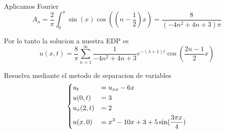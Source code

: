 \message{ !name(MAT024.tex)}\documentclass[../main.tex]{subfiles}
\begin{document}
\begin{solution}
  Aplicamos Fourier
  \begin{equation*}
    A_{n} = \frac{2}{\pi} \int_{0}^{\pi} \sin(x) \cos((n - \frac12)x) = \frac{8}{(-4n^{2} + 4n + 3) \pi}
  \end{equation*}

  Por lo tanto la solucion a nuestra EDP es
  \begin{equation*}
    u(x, t) = \frac{8}{\pi} \sum_{n = 1}^{\infty} \frac{1}{-4n^{2} + 4n + 3} e^{-(\lambda + 1)t} \cos(\frac{2n - 1}{2}x)
  \end{equation*}
\end{solution}

\begin{problem}
  Resuelva mediante el metodo de separacion de variables
  \begin{equation*}
  \begin{dcases}
    u_t &= u_{xx} - 6x\\
    u(0, t) &= 3\\
    u_{x}(2, t) &= 2\\
    u(x, 0) &= x^{3} - 10x + 3 + 5 \sin(\frac{3\pi x}{4})
  \end{dcases}
  \end{equation*}
\end{problem}
\end{document}
